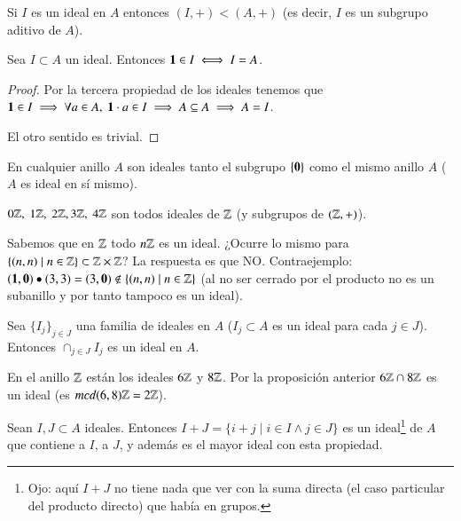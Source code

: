 \begin{pro}
	Si $I$ es un ideal en $A$ entonces $(I, +) < (A, +)$ (es decir, $I$ es un subgrupo aditivo de $A$).
\end{pro}

\begin{pro}
	Sea $I \subset A$ un ideal. Entonces $\mathbf{1} \in I \iff I = A$.
\end{pro}

\begin{proof}
	Por la tercera propiedad de los ideales tenemos que $\mathbf{1} \in I \implies \forall a \in A,\ \mathbf{1} \cdot a \in I \implies A \subseteq A \implies A = I$.
	
	El otro sentido es trivial.
\end{proof}

\begin{ej}
	En cualquier anillo $A$ son ideales tanto el subgrupo $\{\mathbf{0}\}$ como el mismo anillo $A$ ($A$ es ideal en sí mismo).
\end{ej}

\begin{ej}
	$0\mathbb{Z},\ 1\mathbb{Z},\ 2\mathbb{Z}, 3\mathbb{Z},\ 4\mathbb{Z}$ son todos ideales de $\mathbb{Z}$ (y subgrupos de $(\mathbb{Z}, +)$).
\end{ej}

\begin{ej}
	Sabemos que en $\mathbb{Z}$ todo $n\mathbb{Z}$ es un ideal. ¿Ocurre lo mismo para $\{(n,n) \mid n \in \mathbb{Z}\} \subset \mathbb{Z} \times \mathbb{Z}$? La respuesta es que NO. Contraejemplo: $(\mathbf{1},\mathbf{0}) \bullet (3,3) = (3,\mathbf{0}) \notin \{(n,n) \mid n \in \mathbb{Z}\}$ (al no ser cerrado por el producto no es un subanillo y por tanto tampoco es un ideal).
\end{ej}

\begin{pro}
	Sea $\{I_j\}_{j \in J}$ una familia de ideales en $A$ ($I_j \subset A$ es un ideal para cada $j \in J$). Entonces $\cap_{j \in J} I_j$ es un ideal en $A$.
\end{pro}

\begin{ej}
	En el anillo $\mathbb{Z}$ están los ideales $6\mathbb{Z}$ y $8\mathbb{Z}$. Por la proposición anterior $6\mathbb{Z} \cap 8\mathbb{Z}$ es un ideal (es $mcd(6,8)\mathbb{Z} = 2\mathbb{Z}$).
\end{ej}

\begin{pro}
	Sean $I, J \subset A$ ideales. Entonces $I + J = \{i + j \mid i \in I \land j \in J\}$ es un ideal\footnote{Ojo: aquí $I+J$ no tiene nada que ver con la suma directa (el caso particular del producto directo) que había en grupos.} de $A$ que contiene a $I$, a $J$, y además es el mayor ideal con esta propiedad.
\end{pro}

